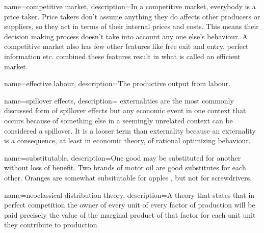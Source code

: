 {
name=competitive market,
description={In a competitive market, everybody is a price taker. Price takers don't assume anything they do affects other producers or suppliers, so they act in terms of their internal prices and costs. This means their decision making process doesn't take into account any one else's behaviour.
A competitive market also has few other features like free exit and entry, perfect information etc. combined these features result in what is called an \gls{efficient market}.} %
}

{
name=effective labour,
description={The productive \gls{output} from labour. %
} %
}

{
name=spillover effects,
description={ \Gls{externalities} are the most commonly discussed form of spillover effects but any economic event in one context that occurs because of something else in a seemingly unrelated context can be considered a spillover. It is a looser term than externality because an externality is a consequence, at least in economic theory, of rational optimizing behaviour.}
}

{
name=substitutable,
description={One good may be substituted for another without loss of benefit. Two brands of motor oil are good substitutes for each other. Oranges are somewhat subsitutable for apples , but not for screwdrivers.}
}

{
name=neoclassical distribution theory,
description={A theory that states that in perfect competition the owner of every unit of every  \gls{factor of production} will be paid precisely the  value of the \gls{marginal product} of that factor for each unit unit they contribute to production.}
}

